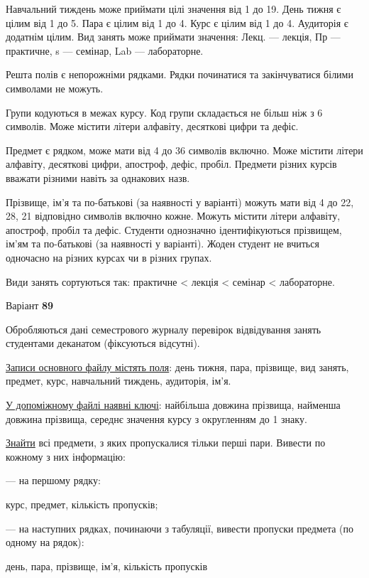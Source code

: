 \documentclass[11pt, ukrainian]{article}
\begin{document}
Навчальний тиждень може приймати цілі значення від 1 до 19.
День тижня є цілим від 1 до 5. Пара є цілим від 1 до 4.
Курс є цілим від 1 до 4. Аудиторія є додатнім цілим.
Вид занять може приймати значення:
Лекц. --- лекція, Пр --- практичне, s --- семінар, Lab --- лабораторне.

Решта полів є непорожніми рядками.
Рядки починатися та закінчуватися білими символами не можуть.

Групи кодуються в межах курсу.
Код групи складається не більш ніж з 6 символів.
Може містити літери алфавіту, десяткові цифри та дефіс.

Предмет є рядком, може мати від 4 до 36 символів включно.
Може містити літери алфавіту, десяткові цифри, апостроф, дефіс, пробіл.
Предмети різних курсів вважати різними навіть за однакових назв.

Прізвище, ім’я та по-батькові (за наявності у варіанті)
можуть мати від 4 до 22, 28, 21 відповідно символів включно кожне.
Можуть містити літери алфавіту, апостроф, пробіл та дефіс.
Студенти однозначно ідентифікуються прізвищем, ім’ям та по-батькові (за наявності у варіанті).
Жоден студент не вчиться одночасно на різних курсах чи в різних групах.

Види занять сортуються так: практичне < лекція < семінар < лабораторне.





\par
\newpage
{\center Варіант  \No \textbf { 89 }\par}
\bigskip
Обробляються дані семестрового журналу перевірок відвідування занять студентами деканатом (фіксуються відсутні). 

\underline{Записи основного файлу містять поля}: день тижня, пара, прізвище, вид занять, предмет, курс, навчальний тиждень, аудиторія, ім’я.

\underline{У допоміжному файлі наявні ключі}: найбільша довжина прізвища, найменша довжина прізвища, середнє значення курсу з округленням до 1 знаку.

\underline{Знайти} всі предмети, з яких пропускалися тільки перші пари. Вивести по кожному з них інформацію:\par
{\noindent}--- на першому рядку:\par
курс, предмет, кількість пропусків;

{\noindent}--- на наступних рядках, починаючи з табуляції, вивести пропуски предмета (по одному на рядок):\par
день, пара, прізвище, ім’я, кількість пропусків
\end{document}
